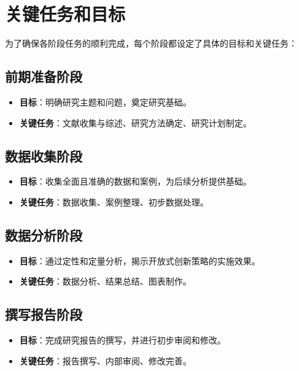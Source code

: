 \section{关键任务和目标}

为了确保各阶段任务的顺利完成，每个阶段都设定了具体的目标和关键任务：

\subsection{前期准备阶段}

\begin{itemize}
    \item \textbf{目标}：明确研究主题和问题，奠定研究基础。
    \item \textbf{关键任务}：文献收集与综述、研究方法确定、研究计划制定。
\end{itemize}

\subsection{数据收集阶段}

\begin{itemize}
    \item \textbf{目标}：收集全面且准确的数据和案例，为后续分析提供基础。
    \item \textbf{关键任务}：数据收集、案例整理、初步数据处理。
\end{itemize}

\subsection{数据分析阶段}

\begin{itemize}
    \item \textbf{目标}：通过定性和定量分析，揭示开放式创新策略的实施效果。
    \item \textbf{关键任务}：数据分析、结果总结、图表制作。
\end{itemize}

\subsection{撰写报告阶段}

\begin{itemize}
    \item \textbf{目标}：完成研究报告的撰写，并进行初步审阅和修改。
    \item \textbf{关键任务}：报告撰写、内部审阅、修改完善。
\end{itemize}

